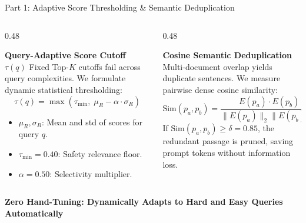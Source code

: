 \documentclass[10pt,aspectratio=169]{beamer}
\begin{document}
\begin{frame}{Part 1: Adaptive Score Thresholding \& Semantic Deduplication}
    \begin{columns}[onlytextwidth,T]
        \begin{column}{0.48\textwidth}
            \begin{block}{\textbf{Query-Adaptive Score Cutoff $\tau(q)$}}
                Fixed Top-$K$ cutoffs fail across query complexities. We formulate dynamic statistical thresholding:
                $$\tau(q) = \max\left( \tau_{\min}, \; \mu_R - \alpha \cdot \sigma_R \right)$$
                \begin{itemize}\setlength\itemsep{2pt}
                    \item $\mu_R, \sigma_R$: Mean and std of scores for query $q$.
                    \item $\tau_{\min} = 0.40$: Safety relevance floor.
                    \item $\alpha = 0.50$: Selectivity multiplier.
                \end{itemize}
            \end{block}
        \end{column}
        
        \begin{column}{0.48\textwidth}
            \begin{block}{\textbf{Cosine Semantic Deduplication}}
                Multi-document overlap yields duplicate sentences. We measure pairwise dense cosine similarity:
                $$\text{Sim}(p_a, p_b) = \frac{E(p_a) \cdot E(p_b)}{\|E(p_a)\|_2 \|E(p_b)\|_2}$$
                If $\text{Sim}(p_a, p_b) \ge \delta = 0.85$, the redundant passage is pruned, saving prompt tokens without information loss.
            \end{block}
        \end{column}
    \end{columns}

    \vspace{0.15cm}
    \begin{center}
        \textcolor{accentgreen}{\textbf{Zero Hand-Tuning: Dynamically Adapts to Hard and Easy Queries Automatically}}
    \end{center}
\end{frame}
\end{document}
